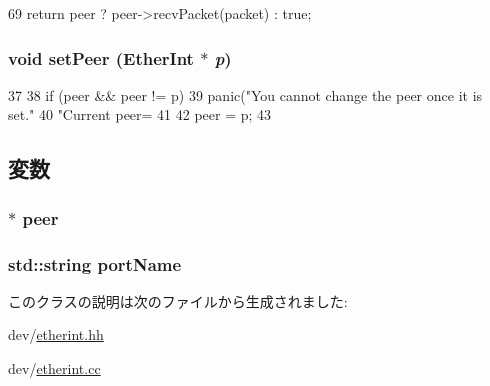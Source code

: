 \begin{DoxyCode}
69     { return peer ? peer->recvPacket(packet) : true; }
\end{DoxyCode}
\hypertarget{classEtherInt_a12ec40007e0f314c816d25e64fb6daa3}{
\subsubsection[{setPeer}]{\setlength{\rightskip}{0pt plus 5cm}void setPeer ({\bf EtherInt} $\ast$ {\em p})}}
\label{classEtherInt_a12ec40007e0f314c816d25e64fb6daa3}



\begin{DoxyCode}
37 {
38     if (peer && peer != p)
39         panic("You cannot change the peer once it is set.\n"
40               "Current peer=%
41 
42     peer = p;
43 }
\end{DoxyCode}


\subsection{変数}
\hypertarget{classEtherInt_a9360307b9d65714e054bd693e249cf51}{
\subsubsection[{peer}]{$\ast$ {\bf peer}}}
\label{classEtherInt_a9360307b9d65714e054bd693e249cf51}
\hypertarget{classEtherInt_a3ba70989fe75b76393da3cbc6bdcf196}{
\subsubsection[{portName}]{\setlength{\rightskip}{0pt plus 5cm}std::string {\bf portName}}}
\label{classEtherInt_a3ba70989fe75b76393da3cbc6bdcf196}


このクラスの説明は次のファイルから生成されました:\begin{DoxyCompactItemize}
\item 
dev/\hyperlink{etherint_8hh}{etherint.hh}\item 
dev/\hyperlink{etherint_8cc}{etherint.cc}\end{DoxyCompactItemize}
